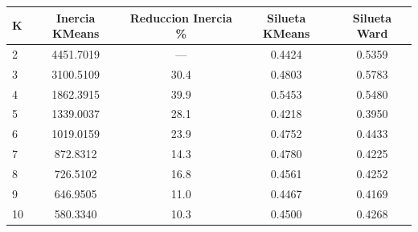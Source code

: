 \begin{tabular}{lcccc}
\toprule
K & Inercia KMeans & Reduccion Inercia \% & Silueta KMeans & Silueta Ward \\
\midrule
2 & 4451.7019 & — & 0.4424 & 0.5359 \\
3 & 3100.5109 & 30.4 & 0.4803 & 0.5783 \\
4 & 1862.3915 & 39.9 & 0.5453 & 0.5480 \\
5 & 1339.0037 & 28.1 & 0.4218 & 0.3950 \\
6 & 1019.0159 & 23.9 & 0.4752 & 0.4433 \\
7 & 872.8312 & 14.3 & 0.4780 & 0.4225 \\
8 & 726.5102 & 16.8 & 0.4561 & 0.4252 \\
9 & 646.9505 & 11.0 & 0.4467 & 0.4169 \\
10 & 580.3340 & 10.3 & 0.4500 & 0.4268 \\
\bottomrule
\end{tabular}